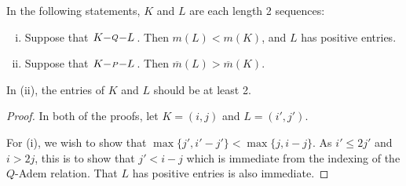 \documentclass[10pt]{article}
\makeatletter
\newcommand{\produces}[3]{{#1}{#3}{#2}}
\renewcommand{\Q}{Q}
\newcommand{\SqShift}{\Sq_{\smash{+}}}
\newcommand{\Sq}{\mathrm{Sq}}
\newcommand{\minDim}{m}
\newcommand{\minDimP}{\overline{m}}
\renewcommand{\produces}[3]{
{
\def\labelstyle{\scriptstyle}
\xymatrix@C=2em@1{
{#1}
\ar@{-}[r]|-{{\,#3\,}}
&%
{#2}%
}}}
\makeatother
\begin{document}
\begin{SteenrodAlgebrasAndTheirKoszulDuals}
\begin{lem}\label{lemOnAdemChangeInM}
In the following statements, $K$ and $L$ are each length 2 sequences:%
%
\begin{enumerate}[i)]
\setlength{\parindent}{.25in}
\item Suppose that $\produces{K}{L}{\Q}$. Then $\minDim(L)<\minDim(K)$, and $L$ has positive entries.
\item Suppose that $\produces{K}{L}{P}$. Then $\minDimP(L) > \minDimP(K)$.
\end{enumerate}
In (ii), the entries of $K$ and $L$ should be at least 2.
\end{lem}
\begin{proof}
In both of the proofs, let $K=(i,j)$ and $L=(i',j')$.

For (i), we wish to show that $\max\{j',i'-j'\}<\max\{j,i-j\}$. As $i'\leq 2j'$ and $i>2j$, this is to show that $j'<i-j$ which is immediate from the indexing of the $\Q$-Adem relation. That $L$ has positive entries is also immediate.


\end{proof}
\end{SteenrodAlgebrasAndTheirKoszulDuals}
\end{document}
